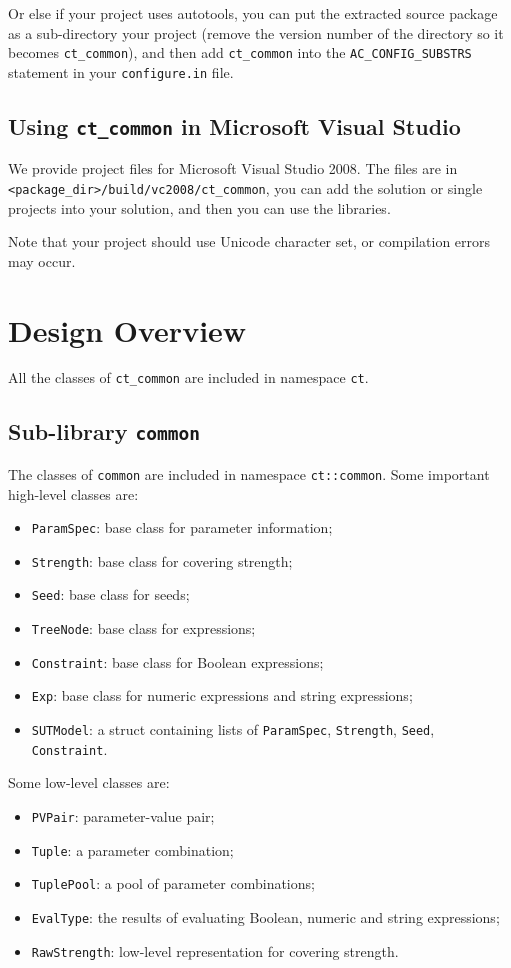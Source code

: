 \documentclass{article}
\begin{document}
Or else if your project uses autotools, you can put the extracted source package as a sub-directory
your project (remove the version number of the directory so it becomes {\tt ct\_common}), and then add
{\tt ct\_common} into the {\tt AC\_CONFIG\_SUBSTRS} statement in your {\tt configure.in} file.

\subsection{Using {\tt ct\_common} in Microsoft Visual Studio}
We provide project files for Microsoft Visual Studio 2008. The files are in
{\tt <package\_dir>/build/vc2008/ct\_common}, you can add the solution or single projects into your
solution, and then you can use the libraries.

Note that your project should use Unicode character set, or compilation errors may occur.

\section{Design Overview}
All the classes of {\tt ct\_common} are included in namespace {\tt ct}.
\subsection{Sub-library {\tt common}}
The classes of {\tt common} are included in namespace {\tt ct::common}.
Some important high-level classes are:
\begin{itemize}
\item {\tt ParamSpec}: base class for parameter information;
\item {\tt Strength}: base class for covering strength;
\item {\tt Seed}: base class for seeds;
\item {\tt TreeNode}: base class for expressions;
\item {\tt Constraint}: base class for Boolean expressions;
\item {\tt Exp}: base class for numeric expressions and string expressions;
\item {\tt SUTModel}: a struct containing lists of {\tt ParamSpec}, {\tt Strength},
    {\tt Seed}, {\tt Constraint}.
\end{itemize}

Some low-level classes are:
\begin{itemize}
\item {\tt PVPair}: parameter-value pair;
\item {\tt Tuple}: a parameter combination;
\item {\tt TuplePool}: a pool of parameter combinations;
\item {\tt EvalType}: the results of evaluating Boolean, numeric and string expressions;
\item {\tt RawStrength}: low-level representation for covering strength.
\end{itemize}
\end{document}
